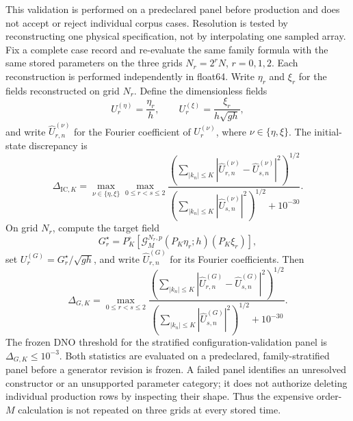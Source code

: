 \documentclass[11pt]{article}
\newcommand{\G}{\mathcal G}
\begin{document}
This validation is performed on a predeclared panel before production and
does not accept or reject individual corpus cases.  Resolution is tested by
reconstructing one physical specification, not by
interpolating one sampled array.  Fix a complete case record and re-evaluate
the same family formula with the same stored parameters on the three grids
$N_r=2^rN$, $r=0,1,2$.  Each reconstruction is performed independently in
float64.  Write $\eta_r$ and $\xi_r$ for the fields reconstructed on grid
$N_r$.  Define the dimensionless fields
\[
  U_r^{(\eta)}=\frac{\eta_r}{h},
  \qquad
  U_r^{(\xi)}=\frac{\xi_r}{h\sqrt{gh}},
\]
and write $\widehat U_{r,n}^{(\nu)}$ for the Fourier coefficient of
$U_r^{(\nu)}$, where $\nu\in\{\eta,\xi\}$.  The initial-state discrepancy is
\begin{equation}
  \Delta_{\mathrm{IC},K}
  =\max_{\nu\in\{\eta,\xi\}}\max_{0\leq r<s\leq2}
   \frac{
     \left(\sum_{|k_n|\leq K}
       |\widehat U_{r,n}^{(\nu)}-\widehat U_{s,n}^{(\nu)}|^2\right)^{1/2}}
        {\left(\sum_{|k_n|\leq K}|\widehat U_{s,n}^{(\nu)}|^2\right)^{1/2}
         +10^{-30}}.
  \label{eq:fixed-band-state-defect}
\end{equation}
On grid $N_r$, compute the target field
\begin{equation}
  G_r^\star=P_K^\circ\!\left[
    \G_M^{N_r,p}(P_K\eta_r;h)(P_K\xi_r)
  \right],
\end{equation}
set $U_r^{(G)}=G_r^\star/\sqrt{gh}$, and write
$\widehat U_{r,n}^{(G)}$ for its Fourier coefficients.  Then
\begin{equation}
  \Delta_{G,K}
  =\max_{0\leq r<s\leq2}
   \frac{
     \left(\sum_{|k_n|\leq K}
       |\widehat U_{r,n}^{(G)}-\widehat U_{s,n}^{(G)}|^2\right)^{1/2}}
        {\left(\sum_{|k_n|\leq K}|\widehat U_{s,n}^{(G)}|^2\right)^{1/2}
         +10^{-30}}.
  \label{eq:fixed-band-dno-defect}
\end{equation}
The frozen DNO threshold for the stratified configuration-validation panel
is $\Delta_{G,K}\leq10^{-3}$.  Both statistics are evaluated on a predeclared,
family-stratified panel before a generator revision is frozen.  A failed
panel identifies an unresolved constructor or an unsupported parameter category;
it does not authorize deleting individual production rows by inspecting
their shape.  Thus the expensive order-$M$ calculation is not repeated on
three grids at every stored time.
\end{document}
